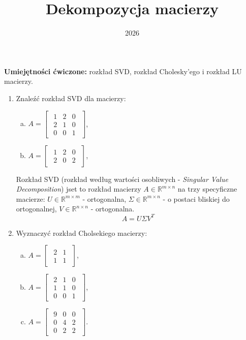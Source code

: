 \documentclass{article}
\title{Dekompozycja macierzy}
\date{2026}
\begin{document}
\maketitle

\begin{center}
\textbf{Umiejętności ćwiczone:} rozkład SVD, rozkład Cholesky'ego i rozkład LU macierzy.
\end{center}



\begin{enumerate}

\item Znaleźć rozkład SVD dla macierzy:
    \begin{enumerate}[a)]
        \item $A = \begin{bmatrix}\begin{array}{rrr} 1 & 2 & 0\\ 2 & 1 & 0\\ 0 & 0 & 1 \end{array}\end{bmatrix}$,
        \item $A = \begin{bmatrix}\begin{array}{rrr} 1 & 2 & 0\\ 2 & 0 & 2 \end{array}\end{bmatrix}$,
    \end{enumerate}

    Rozkład SVD (rozkład według wartości osobliwych - \textit{Singular Value Decomposition}) jset to rozkład macierzy $A \in \mathbb{R}^{m \times n}$ na trzy specyficzne macierze: $U \in \mathbb{R}^{m \times m}$ - ortogonalna, $\Sigma \in \mathbb{R}^{m \times n}$ - o postaci bliskiej do ortogonalnej, $V \in \mathbb{R}^{n \times n}$ - ortogonalna.
    $$
        A = U \Sigma V^{T}
    $$

\item Wyznaczyć rozkład Cholsekiego macierzy:
    \begin{enumerate}[a)]
        \item $A = \begin{bmatrix}\begin{array}{rr} 2 & 1 \\ 1 & 1 \end{array}\end{bmatrix}$,
        \item $A = \begin{bmatrix}\begin{array}{rrr} 2 & 1 & 0\\ 1 & 1 & 0\\ 0 & 0 & 1 \end{array}\end{bmatrix}$,
        \item $A = \begin{bmatrix}\begin{array}{rrr} 9 & 0 & 0\\ 0 & 4 & 2\\ 0 & 2 & 2 \end{array}\end{bmatrix}$.
    \end{enumerate}


\end{enumerate}
\end{document}

